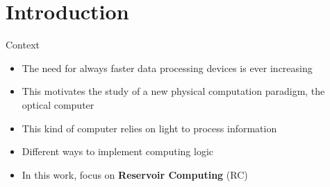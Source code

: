 \section{Introduction}

\begin{frame}{Context}
	\begin{itemize}
		\item The need for always faster data processing devices is ever increasing
		\item This motivates the study of a new physical computation paradigm, the \alert{optical computer}
		\item This kind of computer relies on light to process information
		\item Different ways to implement computing logic
		\item In this work, focus on \textbf{Reservoir Computing} (RC)
	\end{itemize}
\end{frame}